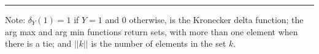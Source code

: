 \documentclass[a4paper]{report}
\begin{document}
        \rule[0.8\baselineskip]{\linewidth}{0.4pt}\vspace{-\baselineskip}
Note: $\delta_{Y}(1) = 1$ if $Y=1$ and 0 otherwise, is the Kronecker delta function; the arg max and arg min functions return sets, with more than one element when there is a tie; and $||k||$ is the number of elements in the set $k$.
\end{document}
